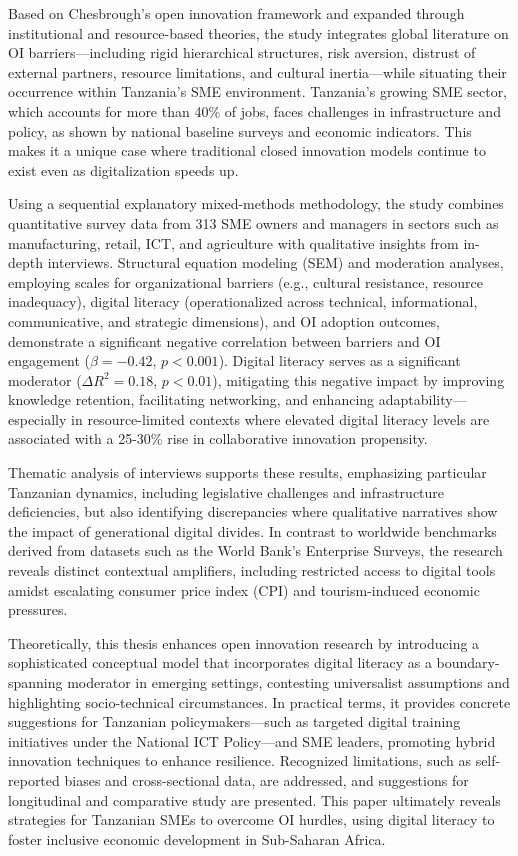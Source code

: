 \documentclass[12pt,a4paper]{article}
\begin{document}
Based on Chesbrough's open innovation framework and expanded through institutional and resource-based theories, the study integrates global literature on OI barriers—including rigid hierarchical structures, risk aversion, distrust of external partners, resource limitations, and cultural inertia—while situating their occurrence within Tanzania's SME environment. Tanzania's growing SME sector, which accounts for more than 40\% of jobs, faces challenges in infrastructure and policy, as shown by national baseline surveys and economic indicators. This makes it a unique case where traditional closed innovation models continue to exist even as digitalization speeds up. 

Using a sequential explanatory mixed-methods methodology, the study combines quantitative survey data from 313 SME owners and managers in sectors such as manufacturing, retail, ICT, and agriculture with qualitative insights from in-depth interviews. Structural equation modeling (SEM) and moderation analyses, employing scales for organizational barriers (e.g., cultural resistance, resource inadequacy), digital literacy (operationalized across technical, informational, communicative, and strategic dimensions), and OI adoption outcomes, demonstrate a significant negative correlation between barriers and OI engagement ($\beta = -0.42$, $p < 0.001$). Digital literacy serves as a significant moderator ($\Delta R^2 = 0.18$, $p < 0.01$), mitigating this negative impact by improving knowledge retention, facilitating networking, and enhancing adaptability—especially in resource-limited contexts where elevated digital literacy levels are associated with a 25-30\% rise in collaborative innovation propensity. 

Thematic analysis of interviews supports these results, emphasizing particular Tanzanian dynamics, including legislative challenges and infrastructure deficiencies, but also identifying discrepancies where qualitative narratives show the impact of generational digital divides. In contrast to worldwide benchmarks derived from datasets such as the World Bank's Enterprise Surveys, the research reveals distinct contextual amplifiers, including restricted access to digital tools amidst escalating consumer price index (CPI) and tourism-induced economic pressures. 

Theoretically, this thesis enhances open innovation research by introducing a sophisticated conceptual model that incorporates digital literacy as a boundary-spanning moderator in emerging settings, contesting universalist assumptions and highlighting socio-technical circumstances. In practical terms, it provides concrete suggestions for Tanzanian policymakers—such as targeted digital training initiatives under the National ICT Policy—and SME leaders, promoting hybrid innovation techniques to enhance resilience. Recognized limitations, such as self-reported biases and cross-sectional data, are addressed, and suggestions for longitudinal and comparative study are presented. This paper ultimately reveals strategies for Tanzanian SMEs to overcome OI hurdles, using digital literacy to foster inclusive economic development in Sub-Saharan Africa.
\end{document}
